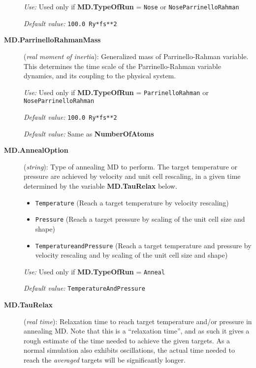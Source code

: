 \begin{description}
\textit{Use:} Used only if \textbf{MD.TypeOfRun} = \texttt{Nose} or
\texttt{NoseParrinelloRahman}

\textit{Default value:} \texttt{100.0 Ry*fs**2}

\item[\textbf{MD.ParrinelloRahmanMass}] (\textit{real moment of inertia}):
  Generalized mass of Parrinello-Rahman variable.  This determines the
  time scale of the Parrinello-Rahman variable dynamics, and its
  coupling to the physical system.

\textit{Use:} Used only if \textbf{MD.TypeOfRun} = \texttt{ParrinelloRahman}
or \texttt{NoseParrinelloRahman}

\textit{Default value:} \texttt{100.0 Ry*fs**2}


\textit{Default value:}  Same as \textbf{NumberOfAtoms}

\item[\textbf{MD.AnnealOption}] (\textit{string}):
   Type of annealing MD
  to perform. The target temperature or pressure are achieved by
  velocity and unit cell rescaling, in a given time determined by the
  variable \textbf{MD.TauRelax} below.
\begin{itemize}
\item \texttt{Temperature} (Reach a target temperature by velocity
  rescaling)
\item \texttt{Pressure} (Reach a target pressure by scaling of the unit
  cell size and shape)
\item \texttt{TemperatureandPressure} (Reach a target temperature and
  pressure by velocity rescaling and by scaling of the unit cell size
  and shape)
\end{itemize}

\textit{Use:} Used only if \textbf{MD.TypeOfRun} = \texttt{Anneal}

\textit{Default value:} \texttt{TemperatureAndPressure}

\item[\textbf{MD.TauRelax}] (\textit{real time}):  Relaxation time to reach target temperature and/or
  pressure in annealing MD. Note that this is a ``relaxation time'',
  and as such it gives a rough estimate of the time needed to achieve
  the given targets. As a normal simulation also exhibits
  oscillations, the actual time needed to reach the \textit{averaged}
  targets will be significantly longer.


\end{description}
